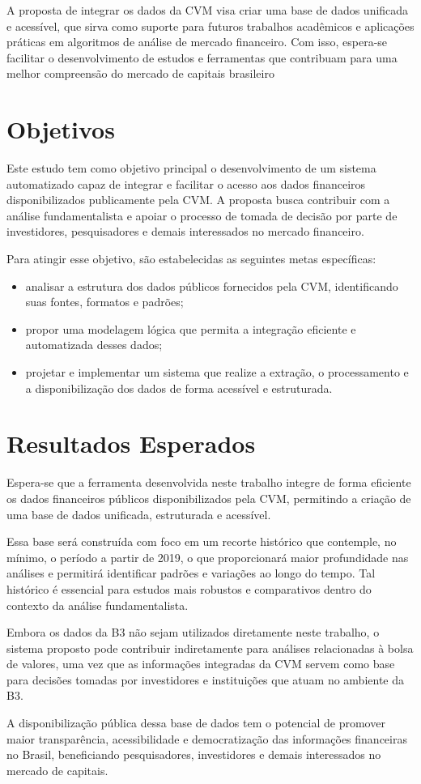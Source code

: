 A proposta de integrar os dados da CVM visa criar uma base de dados unificada e acessível, que sirva como suporte para futuros trabalhos acadêmicos e aplicações práticas em algoritmos de análise de mercado financeiro. Com isso, espera-se facilitar o desenvolvimento de estudos e ferramentas que contribuam para uma melhor compreensão do mercado de capitais brasileiro \cite{lindman:2020:integration}

\section{Objetivos}\label{sec:objetivos}

Este estudo tem como objetivo principal o desenvolvimento de um sistema automatizado capaz de integrar e facilitar o acesso aos dados financeiros disponibilizados publicamente pela CVM. A proposta busca contribuir com a análise fundamentalista e apoiar o processo de tomada de decisão por parte de investidores, pesquisadores e demais interessados no mercado financeiro.

Para atingir esse objetivo, são estabelecidas as seguintes metas específicas:

\begin{itemize} 
	\item analisar a estrutura dos dados públicos fornecidos pela CVM, identificando suas fontes, formatos e padrões; 
	\item propor uma modelagem lógica que permita a integração eficiente e automatizada desses dados; 
	\item projetar e implementar um sistema que realize a extração, o processamento e a disponibilização dos dados de forma acessível e estruturada. 
\end{itemize}


\section{Resultados Esperados}\label{sec:resultados}

Espera-se que a ferramenta desenvolvida neste trabalho integre de forma eficiente os dados financeiros públicos disponibilizados pela CVM, permitindo a criação de uma base de dados unificada, estruturada e acessível.

Essa base será construída com foco em um recorte histórico que contemple, no mínimo, o período a partir de 2019, o que proporcionará maior profundidade nas análises e permitirá identificar padrões e variações ao longo do tempo. Tal histórico é essencial para estudos mais robustos e comparativos dentro do contexto da análise fundamentalista.

Embora os dados da B3 não sejam utilizados diretamente neste trabalho, o sistema proposto pode contribuir indiretamente para análises relacionadas à bolsa de valores, uma vez que as informações integradas da CVM servem como base para decisões tomadas por investidores e instituições que atuam no ambiente da B3.

A disponibilização pública dessa base de dados tem o potencial de promover maior transparência, acessibilidade e democratização das informações financeiras no Brasil, beneficiando pesquisadores, investidores e demais interessados no mercado de capitais.
